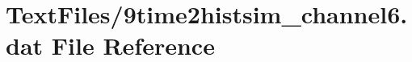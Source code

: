 \hypertarget{9time2histsim__channel6_8dat}{}\section{Text\+Files/9time2histsim\+\_\+channel6.dat File Reference}
\label{9time2histsim__channel6_8dat}
